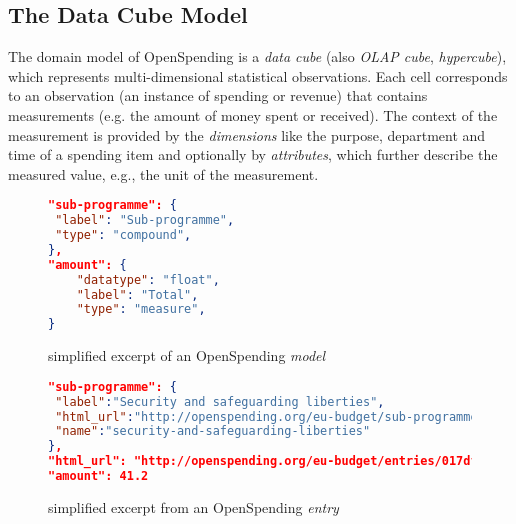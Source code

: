 \documentclass[sw]{iosart2x}
\begin{document}
\subsection{The Data Cube Model}%
The domain model of OpenSpending is a \emph{data cube} (also \emph{OLAP cube}, \emph{hypercube}), which represents multi-dimensional statistical observations.
Each cell corresponds to an observation (an instance of spending or revenue) that contains measurements (e.g. the amount of money spent or received).
The context of the measurement is provided by the \emph{dimensions} like the purpose, department and time of a spending item and optionally by \emph{attributes}, which further describe the measured value, e.g., the unit of the measurement.
\begin{figure}[h]
\footnotesize
\begin{lstlisting}[language=json]
"sub-programme": {
 "label": "Sub-programme",
 "type": "compound",
},
"amount": {
    "datatype": "float",
    "label": "Total",
    "type": "measure",
}
\end{lstlisting}
\caption{simplified excerpt of an OpenSpending \emph{model}} 
\label{fig:jsonmodel}
\end{figure}

\begin{figure}[h]
{\footnotesize
\begin{lstlisting}[language=json]
"sub-programme": {
 "label":"Security and safeguarding liberties",
 "html_url":"http://openspending.org/eu-budget/sub-programme/security-and-safeguarding-liberties",
 "name":"security-and-safeguarding-liberties"
},
"html_url": "http://openspending.org/eu-budget/entries/017dfcb58d05671ef9eb5a9f77fef39c8b14150c",
"amount": 41.2
\end{lstlisting}
}
\iffalse
"main-programme": {

    "description": null,
    "label": "Main programme",
    "facet": true,
    "key": true,
    "attributes": {
        "name": {
            "column": "StringCAT1",
            "datatype": "id",
            "default_value": ""
        },
        "label": {
            "column": "StringCAT1",
            "datatype": "string",
            "default_value": ""
        }
    },
    "type": "compound",
    "dimension": "main-programme"
},
"main-programme": {
 "label":"Citizenship, Freedom ,Security and Justice",
 "html_url":"http://openspending.org/eu-budget/main-programme/citizenship-freedom-security-and-justice",
 "name":"citizenship-freedom-security-and-justice"
},

\fi
\caption{simplified excerpt from an OpenSpending \emph{entry}}
\label{fig:jsonentry}
\end{figure}
\end{document}
